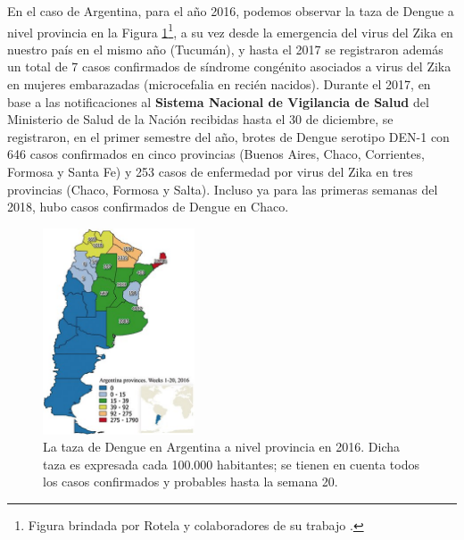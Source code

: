   \par En el caso de Argentina, para el año 2016, podemos observar la taza de
  Dengue a nivel
  provincia \cite{analisis_cordoba} en la
  Figura \ref{fig:dengue}\footnote{Figura brindada por Rotela y
  colaboradores de su trabajo \cite{analisis_cordoba}.}, a su vez desde la
  emergencia del virus del Zika en nuestro país en el mismo año (Tucumán),
  y hasta el 2017 se registraron además un total de 7 casos confirmados de
  síndrome congénito asociados a virus del Zika en mujeres embarazadas
  (microcefalia en recién nacidos).
  Durante el 2017, en base a las notificaciones al
  \textbf{Sistema Nacional de Vigilancia de Salud} del Ministerio de Salud de la Nación
  recibidas hasta el 30 de diciembre, se registraron, en el primer semestre del año, brotes de
  Dengue serotipo DEN-1 con 646 casos confirmados en cinco provincias
  (Buenos Aires, Chaco, Corrientes, Formosa y Santa Fe) y 253 casos de enfermedad
  por virus del Zika en tres provincias (Chaco, Formosa y Salta).
  Incluso ya para las primeras semanas del 2018, hubo casos confirmados
  de Dengue en Chaco.

  \begin{figure}
  \centering%
  \includegraphics[width=0.4\textwidth]{images/dengue}%
  \caption{La taza de Dengue en Argentina a nivel provincia en 2016.
          Dicha taza es expresada cada 100.000 habitantes; se tienen en cuenta
          todos los casos confirmados y probables hasta la semana 20.}\label{fig:dengue}
  \end{figure}


